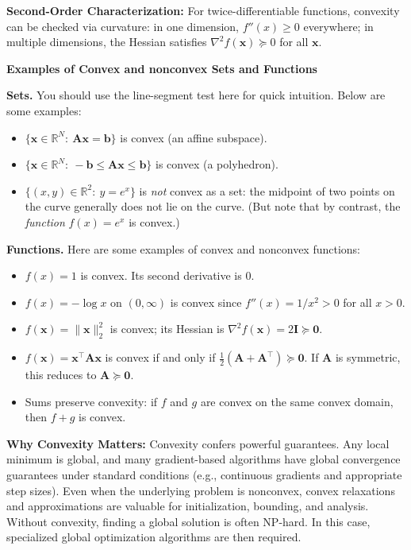 \textbf{Second-Order Characterization:}
For twice-differentiable functions, convexity can be checked via curvature: in one dimension, $f''(x)\ge 0$ everywhere; in multiple dimensions, the Hessian satisfies $\nabla^2 f(\mathbf{x}) \succeq 0$ for all $\mathbf{x}$.

\begin{exampleBox}
    \textbf{Examples of Convex and nonconvex Sets and Functions}

    \textbf{Sets.} You should use the line-segment test here for quick intuition. Below are some examples:
    \begin{itemize}
        \item \(\{\mathbf{x}\in\mathbb{R}^N:\ \mathbf{A}\mathbf{x}=\mathbf{b}\}\) is convex (an affine subspace).
        \item \(\{\mathbf{x}\in\mathbb{R}^N:\ -\mathbf{b}\le \mathbf{A}\mathbf{x}\le \mathbf{b}\}\) is convex (a polyhedron).
        \item \(\{(x,y)\in\mathbb{R}^2:\ y=e^{x}\}\) is \emph{not} convex as a set: the midpoint of two points on the curve generally does not lie on the curve. (But note that by contrast, the \emph{function} $f(x) = e^{x}$ is convex.)
    \end{itemize}

    \textbf{Functions.} Here are some examples of convex and nonconvex functions:
    \begin{itemize}
        \item \(f(x)=1\) is convex. Its second derivative is \(0\).
        \item \(f(x)=-\log x\) on \((0,\infty)\) is convex since \(f''(x)=1/x^{2}>0\) for all \(x > 0\).
        \item \(f(\mathbf{x})=\|\mathbf{x}\|_2^2\) is convex; its Hessian is \(\nabla^2 f(\mathbf{x})=2\mathbf{I}\succeq \mathbf{0}\).
        \item \(f(\mathbf{x})=\mathbf{x}^\top \mathbf{A}\mathbf{x}\) is convex if and only if \(\frac{1}{2}\left(\mathbf{A}+\mathbf{A}^\top\right)\succeq \mathbf{0}\). If $\mathbf{A}$ is symmetric, this reduces to $\mathbf{A}\succeq \mathbf{0}$. 
        \item Sums preserve convexity: if \(f\) and \(g\) are convex on the same convex domain, then \(f+g\) is convex.
    \end{itemize}
    \end{exampleBox}

\textbf{Why Convexity Matters:} Convexity confers powerful guarantees. Any local minimum is global, and many gradient-based algorithms have global convergence guarantees under standard conditions (e.g., continuous gradients and appropriate step sizes). Even when the underlying problem is nonconvex, convex relaxations and approximations are valuable for initialization, bounding, and analysis. Without convexity, finding a global solution is often NP-hard. In this case, specialized global optimization algorithms are then required.

